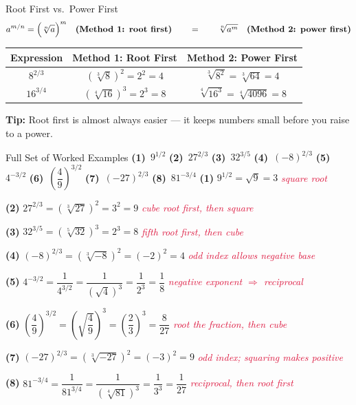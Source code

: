 \documentclass[12pt]{article}
\newcommand{\step}[1]{\hfill\textcolor{crimson}{\small\textit{#1}}}
\begin{document}
\begin{conceptbox}{Root First vs.\ Power First}
\[
  a^{m/n} = \Bigl(\sqrt[n]{a}\Bigr)^m \quad\textbf{(Method 1: root first)}
  \qquad=\qquad
  \sqrt[n]{a^m} \quad\textbf{(Method 2: power first)}
\]
\begin{center}
\renewcommand{\arraystretch}{1.5}
\begin{tabular}{>{\bfseries}ccc}
\toprule
Expression & Method 1: Root First & Method 2: Power First \\
\midrule
$8^{2/3}$
  & $(\sqrt[3]{8})^2=2^2=4$
  & $\sqrt[3]{8^2}=\sqrt[3]{64}=4$ \\[4pt]
$16^{3/4}$
  & $(\sqrt[4]{16})^3=2^3=8$
  & $\sqrt[4]{16^3}=\sqrt[4]{4096}=8$ \\
\bottomrule
\end{tabular}
\end{center}
\begin{tipbox}
\textbf{Tip:} Root first is almost always easier --- it keeps numbers small before you raise to a power.
\end{tipbox}
\end{conceptbox}

\begin{examplebox}{Full Set of Worked Examples}
\textbf{(1)}~$9^{1/2}$\quad
\textbf{(2)}~$27^{2/3}$\quad
\textbf{(3)}~$32^{3/5}$\quad
\textbf{(4)}~$(-8)^{2/3}$\quad
\textbf{(5)}~$4^{-3/2}$\quad
\textbf{(6)}~$\left(\dfrac{4}{9}\right)^{3/2}$\quad
\textbf{(7)}~$(-27)^{2/3}$\quad
\textbf{(8)}~$81^{-3/4}$
\tcblower
\textbf{(1)} $9^{1/2}=\sqrt{9}=\boxed{3}$ \step{square root}

\medskip
\textbf{(2)} $27^{2/3}=(\sqrt[3]{27})^2=3^2=\boxed{9}$ \step{cube root first, then square}

\medskip
\textbf{(3)} $32^{3/5}=(\sqrt[5]{32})^3=2^3=\boxed{8}$ \step{fifth root first, then cube}

\medskip
\textbf{(4)} $(-8)^{2/3}=(\sqrt[3]{-8})^2=(-2)^2=\boxed{4}$ \step{odd index allows negative base}

\medskip
\textbf{(5)} $4^{-3/2}=\dfrac{1}{4^{3/2}}=\dfrac{1}{(\sqrt{4})^3}=\dfrac{1}{2^3}=\boxed{\dfrac{1}{8}}$ \step{negative exponent $\Rightarrow$ reciprocal}

\medskip
\textbf{(6)} $\left(\dfrac{4}{9}\right)^{3/2}=\left(\sqrt{\dfrac{4}{9}}\right)^3=\left(\dfrac{2}{3}\right)^3=\boxed{\dfrac{8}{27}}$ \step{root the fraction, then cube}

\medskip
\textbf{(7)} $(-27)^{2/3}=(\sqrt[3]{-27})^2=(-3)^2=\boxed{9}$ \step{odd index; squaring makes positive}

\medskip
\textbf{(8)} $81^{-3/4}=\dfrac{1}{81^{3/4}}=\dfrac{1}{(\sqrt[4]{81})^3}=\dfrac{1}{3^3}=\boxed{\dfrac{1}{27}}$ \step{reciprocal, then root first}
\end{examplebox}
\end{document}
